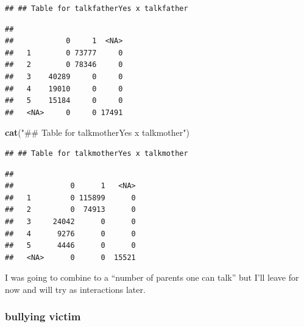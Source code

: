 \documentclass[
]{article}
\newenvironment{Shaded}{\begin{snugshade}}{\end{snugshade}}
\newcommand{\AttributeTok}[1]{\textcolor[rgb]{0.13,0.29,0.53}{#1}}
\newcommand{\FunctionTok}[1]{\textcolor[rgb]{0.13,0.29,0.53}{\textbf{#1}}}
\newcommand{\NormalTok}[1]{#1}
\newcommand{\SpecialCharTok}[1]{\textcolor[rgb]{0.81,0.36,0.00}{\textbf{#1}}}
\newcommand{\StringTok}[1]{\textcolor[rgb]{0.31,0.60,0.02}{#1}}
\begin{document}
\begin{verbatim}
## ## Table for talkfatherYes x talkfather
\end{verbatim}

\begin{Shaded}
\end{Shaded}

\begin{verbatim}
##       
##            0     1  <NA>
##   1        0 73777     0
##   2        0 78346     0
##   3    40289     0     0
##   4    19010     0     0
##   5    15184     0     0
##   <NA>     0     0 17491
\end{verbatim}

\begin{Shaded}
\begin{Highlighting}[]
\FunctionTok{cat}\NormalTok{(}\StringTok{"\#\# Table for talkmotherYes x talkmother"}\NormalTok{)}
\end{Highlighting}
\end{Shaded}

\begin{verbatim}
## ## Table for talkmotherYes x talkmother
\end{verbatim}

\begin{Shaded}
\end{Shaded}

\begin{verbatim}
##       
##             0      1   <NA>
##   1         0 115899      0
##   2         0  74913      0
##   3     24042      0      0
##   4      9276      0      0
##   5      4446      0      0
##   <NA>      0      0  15521
\end{verbatim}

I was going to combine to a ``number of parents one can talk'' but I'll
leave for now and will try as interactions later.

\subsubsection{bullying victim}\label{bullying-victim}
\end{document}
